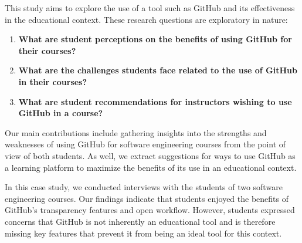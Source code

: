 
This study aims to explore the use of a tool such as GitHub and its effectiveness in the educational context. These research questions are exploratory in nature:
\begin{enumerate}
\item \textbf{What are student perceptions on the benefits of using GitHub for their courses?}
\item \textbf{What are the challenges students face related to the use of GitHub in their courses?}
\item \textbf{What are student recommendations for instructors wishing to use GitHub in a course?}
\end{enumerate}

Our main contributions include gathering insights into the strengths and weaknesses of using GitHub for software engineering courses from the point of view of both students. As well, we extract suggestions for ways to use GitHub as a learning platform to maximize the benefits of its use in an educational context.

In this case study, we conducted interviews with the students of two software engineering courses. Our findings indicate that students enjoyed the benefits of GitHub's transparency features and open workflow. However, students expressed concerns that GitHub is not inherently an educational tool and is therefore missing key features that prevent it from being an ideal tool for this context.




